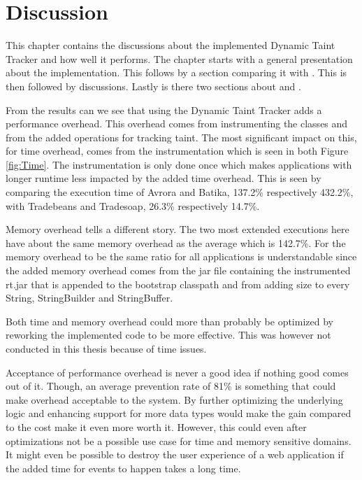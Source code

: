 \chapter{Discussion}
This chapter contains the discussions about the implemented Dynamic Taint Tracker and how well it performs. The chapter starts with a general presentation about the implementation. This follows by a section comparing it with \textit{}. This is then followed by \textit{} discussions. Lastly is there two sections about \textit{} and \textit{}.

From the results can we see that using the Dynamic Taint Tracker adds a performance overhead. This overhead comes from instrumenting the classes and from the added operations for tracking taint. The most significant impact on this, for time overhead, comes from the instrumentation which is seen in both Figure \ref{fig:Time}. The instrumentation is only done once which makes applications with longer runtime less impacted by the added time overhead. This is seen by comparing the execution time of Avrora and Batika, 137.2\% respectively 432.2\%, with Tradebeans and Tradesoap, 26.3\% respectively 14.7\%.

Memory overhead tells a different story. The two most extended executions here have about the same memory overhead as the average which is 142.7\%. For the memory overhead to be the same ratio for all applications is understandable since the added memory overhead comes from the jar file containing the instrumented rt.jar that is appended to the bootstrap classpath and from adding size to every String, StringBuilder and StringBuffer.

Both time and memory overhead could more than probably be optimized by reworking the implemented code to be more effective. This was however not conducted in this thesis because of time issues.

Acceptance of performance overhead is never a good idea if nothing good comes out of it. Though, an average prevention rate of 81\% is something that could make overhead acceptable to the system. By further optimizing the underlying logic and enhancing support for more data types would make the gain compared to the cost make it even more worth it. However, this could even after optimizations not be a possible use case for time and memory sensitive domains. It might even be possible to destroy the user experience of a web application if the added time for events to happen takes a long time.



